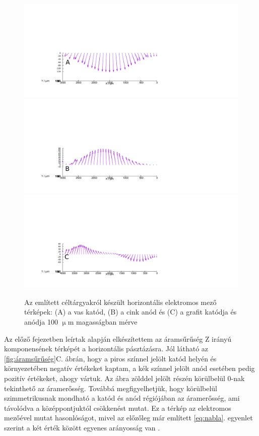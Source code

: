 \begin{figure}
\centering
\includegraphics[width=1.2\textwidth]{img/mérések/Fe_h100.pdf}
\includegraphics[width=1.2\textwidth]{img/mérések/Zn_h100.pdf}
\includegraphics[width=1.2\textwidth]{img/mérések/grafit_h100.pdf}

\caption{Az említett céltárgyakról készült horizontális elektromos mező térképek:
(A) a vas katód, (B) a cink anód és (C) a grafit katódja és anódja 100 $\upmu$m magasságban mérve}
\label{fig:field_h}
\end{figure}


Az előző fejezetben leírtak alapján elkészítettem az áramsűrűség Z irányú komponensének térképét a horizontális pásztázásra. Jól látható az \ref{fig:áramsűrűség}C. ábrán, hogy a piros színnel jelölt katód helyén és környezetében negatív értékeket kaptam, a kék színnel jelölt anód esetében pedig pozitív értékeket, ahogy vártuk. Az ábra zölddel jelölt részén körülbelül 0-nak tekinthető az áramerősség. Továbbá megfigyelhetjük, hogy körülbelül szimmetrikusnak mondható a katód és anód régiójában az áramerősség, ami távolódva a középpontjuktól csökkenést mutat. Ez a térkép az elektromos mezőével mutat hasonlóságot, mivel az előzőleg már említett \ref{eq:nabla}. egyenlet szerint a két érték között egyenes arányosság van \cite{isaacs1981scanning,bastos2017application}.


